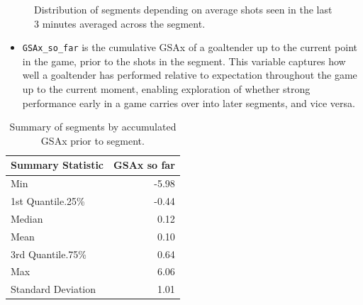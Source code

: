 \documentclass[
  letterpaper,
  DIV=11,
  numbers=noendperiod]{scrartcl}
\providecommand{\tightlist}{%
  \setlength{\itemsep}{0pt}\setlength{\parskip}{0pt}}\usepackage{longtable,booktabs,array}
\begin{document}
\begin{figure}


\caption{\label{fig-5}Distribution of segments depending on average
shots seen in the last 3 minutes averaged across the segment.}

\end{figure}%

\begin{itemize}
\tightlist
\item
  \texttt{GSAx\_so\_far} is the cumulative GSAx of a goaltender up to
  the current point in the game, prior to the shots in the segment. This
  variable captures how well a goaltender has performed relative to
  expectation throughout the game up to the current moment, enabling
  exploration of whether strong performance early in a game carries over
  into later segments, and vice versa.
\end{itemize}

\begin{longtable}[]{@{}lr@{}}

\caption{\label{tbl-8}Summary of segments by accumulated GSAx prior to
segment.}

\tabularnewline

\toprule\noalign{}
Summary Statistic & GSAx so far \\
\midrule\noalign{}
\endhead
\bottomrule\noalign{}
\endlastfoot
Min & -5.98 \\
1st Quantile.25\% & -0.44 \\
Median & 0.12 \\
Mean & 0.10 \\
3rd Quantile.75\% & 0.64 \\
Max & 6.06 \\
Standard Deviation & 1.01 \\

\end{longtable}
\end{document}
